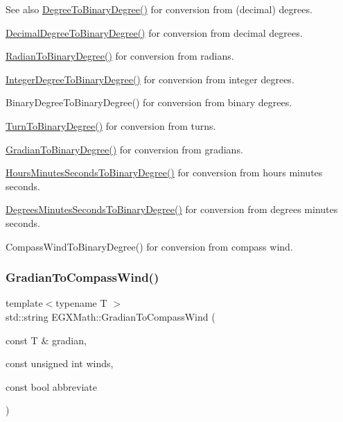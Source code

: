 \begin{DoxySeeAlso}{See also}
\mbox{\hyperlink{group___e_g_x_math-_conversions-_angle_conversions-_degree_gacd1e3dc5194e89426a899a7cac4874f8}{Degree\+To\+Binary\+Degree()}} for conversion from (decimal) degrees. 

\mbox{\hyperlink{group___e_g_x_math-_conversions-_angle_conversions-_decimal_degree_gaceec7ae7988c7f342d0b0fa6940720a1}{Decimal\+Degree\+To\+Binary\+Degree()}} for conversion from decimal degrees. 

\mbox{\hyperlink{group___e_g_x_math-_conversions-_angle_conversions-_radian_ga13311d9b6977d514f1d6c336e7c0162b}{Radian\+To\+Binary\+Degree()}} for conversion from radians. 

\mbox{\hyperlink{group___e_g_x_math-_conversions-_angle_conversions-_integer_degree_ga694bbfe624c3c14e97ce6155ca9bc44d}{Integer\+Degree\+To\+Binary\+Degree()}} for conversion from integer degrees. 

Binary\+Degree\+To\+Binary\+Degree() for conversion from binary degrees. 

\mbox{\hyperlink{group___e_g_x_math-_conversions-_angle_conversions-_turn_ga678efb8f5c3958351fc3f1dfaf117b28}{Turn\+To\+Binary\+Degree()}} for conversion from turns. 

\mbox{\hyperlink{group___e_g_x_math-_conversions-_angle_conversions-_gradian_ga6bf31920148bfd61f1f06eb961c3f62b}{Gradian\+To\+Binary\+Degree()}} for conversion from gradians. 

\mbox{\hyperlink{group___e_g_x_math-_conversions-_angle_conversions-_hours_minutes_seconds_ga962a367fd21f0047eb0a7116a59c2bfc}{Hours\+Minutes\+Seconds\+To\+Binary\+Degree()}} for conversion from hours minutes seconds. 

\mbox{\hyperlink{group___e_g_x_math-_conversions-_angle_conversions-_degrees_minutes_seconds_ga838c47916ce872cab2dfecd5ccf0a6ee}{Degrees\+Minutes\+Seconds\+To\+Binary\+Degree()}} for conversion from degrees minutes seconds. 

Compass\+Wind\+To\+Binary\+Degree() for conversion from compass wind. 
\end{DoxySeeAlso}
\mbox{\label{group___e_g_x_math-_conversions-_angle_conversions-_gradian_ga52ed2e44217e6a57e56829bee36612dc}} 
\subsubsection{\texorpdfstring{Gradian\+To\+Compass\+Wind()}{GradianToCompassWind()}}
{\footnotesize\ttfamily template$<$typename T $>$ \\
std\+::string E\+G\+X\+Math\+::\+Gradian\+To\+Compass\+Wind (\begin{DoxyParamCaption}\item[{const T \&}]{gradian,  }\item[{const unsigned int}]{winds,  }\item[{const bool}]{abbreviate }\end{DoxyParamCaption})}




